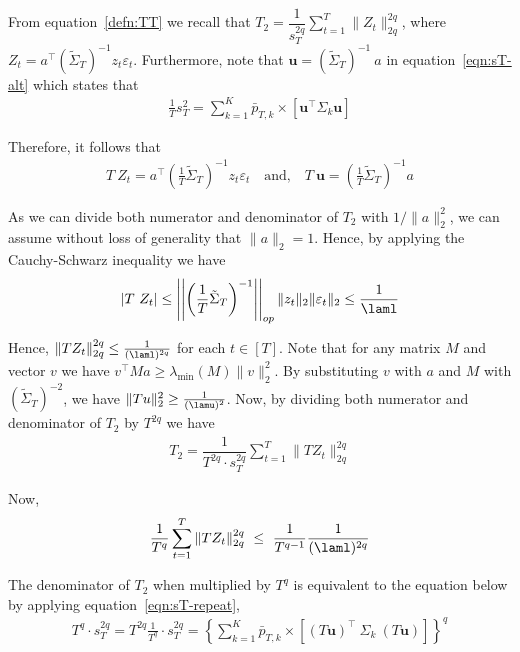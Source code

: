 \documentclass[11pt,letterpaper]{article}
\newcommand{\PT}{\tilde{\Sigma}_T}
\newcommand{\lvec}{\textbf{u}}
\theoremstyle{plain}
\theoremstyle{definition}  %
\begin{document}
\noindent From equation~\eqref{defn:TT} we recall that $T_2 = \dfrac{1}{s^{2q}_T}\sum^T_{t=1} \| Z_t\|^{2q}_{2q}$, where $Z_t = a^\top (\PT)^{-1}z_t\varepsilon_t$. Furthermore, note that $\lvec = (\PT)^{-1}\ a$ in equation~\eqref{eqn:sT-alt} which states that
\begin{align}\label{eqn:sT-repeat}
    \frac{1}{T}s^2_T = \sum^K_{k=1} \bar{p}_{T,k} \times \left[  \lvec^{\top} \Sigma_k \lvec \right] 
\end{align}

\noindent Therefore, it follows that 
\begin{align*}
    T \ Z_t = a^\top \left( \frac{1}{T}\PT \right)^{-1}z_t \varepsilon_t
    \quad \text{and,} \quad
    T \ \lvec = \left( \frac{1}{T}\PT \right)^{-1} a
\end{align*}

\noindent As we can divide both numerator and denominator of $T_2$ with $1/\|a\|^2_2$, we can assume without loss of generality that $\|a\|_2 = 1$. Hence, by applying the Cauchy-Schwarz inequality we have
\begin{align}
    | T \ Z_t|
    \leq \left| \left| \left( \frac{1}{T}\PT \right)^{-1} \right| \right|_{op} \|z_t\|_2 \|\varepsilon_t\|_2
    \leq \frac{1}{\laml}
\end{align}

\noindent Hence, $\|TZ_t\|^{2q}_{2q} \leq \frac{1}{(\laml)^{2q}}$ for each $t \in [T]$. Note that for any matrix $M$ and vector $v$ we have $v^\top M a \geq \lambda_{\min}(M) \|v\|^2_2$. By substituting $v$ with $a$ and $M$ with $(\PT)^{-2}$, we have $\|Tu\|^2_2 \geq \frac{1}{(\lamu)^2}$. Now, by dividing both numerator and denominator of $T_2$ by $T^{2q}$ we have
\begin{align*}
    T_2 = \dfrac{1}{T^{2q} \cdot s^{2q}_T}\sum^T_{t=1} \| TZ_t\|^{2q}_{2q}
\end{align*}

\noindent Now,
\begin{align}\label{eqn:Tto-numer}
    \frac{1}{T^{q}} \sum^T_{t=1} \| TZ_t\|^{2q}_{2q} \ \leq \ \frac{1}{T^{q-1}} \frac{1}{(\laml)^{2q}}
\end{align}

\noindent The denominator of $T_2$ when multiplied by $T^q$ is equivalent to the equation below by applying  equation~\eqref{eqn:sT-repeat},
\begin{align}\label{eqn:Tto-denom}
    T^q \cdot s^{2q}_T
    = T^{2q} \frac{1}{T^q}\cdot s^{2q}_T
    = \left\{ \sum^K_{k=1} \bar{p}_{T,k} \times \left[  (T\lvec)^{\top} \  \Sigma_k \ (T\lvec) \right]
    \right\}^q
\end{align}
\end{document}

